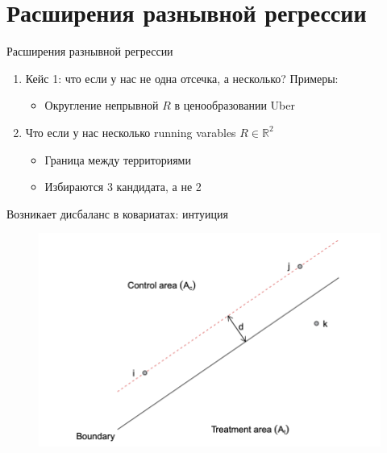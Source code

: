 
\section{Расширения разнывной регрессии}

\begin{frame}{Расширения разнывной регрессии}
\begin{enumerate}
    \item Кейс 1: что если у нас не одна отсечка, а несколько? Примеры:
    \begin{itemize}
        \item Округление непрывной $R$ в ценообразовании Uber
    \end{itemize}
    \item Что если у нас несколько running varables $R \in \mathbb{R}^2$
    \begin{itemize}
        \item Граница между территориями
        \item Избираются 3 кандидата, а не 2
    \end{itemize}
\end{enumerate}
    
\end{frame}


\begin{frame}{Возникает дисбаланс в ковариатах: интуиция}
    \begin{figure}
        \centering
        \includegraphics[width=\textwidth]{Images/pool bad.png}
    \end{figure}
\end{frame}



